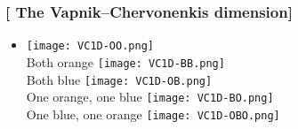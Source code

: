 \documentclass[xcolor=x11names,compress]{beamer}
\renewcommand{\(}{\begin{columns}}
\renewcommand{\)}{\end{columns}}
\newcommand{\<}[1]{\begin{column}{#1}}
\renewcommand{\>}{\end{column}}
\begin{document}
\begin{frame} %
\frametitle{\textcolor{brique}{[ The  Vapnik–Chervonenkis dimension]}}
\begin{itemize}
   \item[]
    {\texttt{[image: VC1D-OO.png]} \\ }
    {Both orange }
    {\texttt{[image: VC1D-BB.png]} \\ }
    {Both blue}
    {\texttt{[image: VC1D-OB.png]} \\ }
    {One orange, one blue}
    {\texttt{[image: VC1D-BO.png]} \\ }
    {One blue, one orange}
    {\texttt{[image: VC1D-OBO.png]}  \\ }
\end{itemize}
\end{frame}
\end{document}
